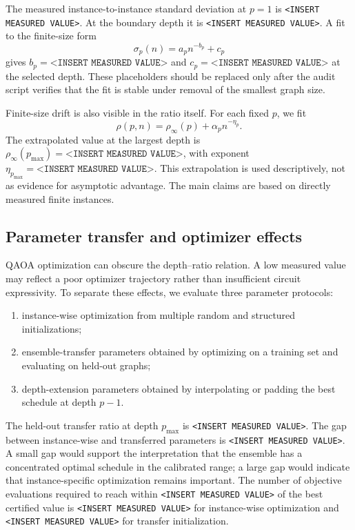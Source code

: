 \documentclass[reprint,aps,longbibliography]{revtex4-2}
\begin{document}
The measured instance-to-instance standard deviation at $p=1$ is \texttt{<INSERT MEASURED VALUE>}. At the boundary depth it is \texttt{<INSERT MEASURED VALUE>}. A fit to the finite-size form
\begin{equation}
  \sigma_p(n)=a_p n^{-b_p}+c_p
\end{equation}
gives $b_p=\texttt{<INSERT MEASURED VALUE>}$ and $c_p=\texttt{<INSERT MEASURED VALUE>}$ at the selected depth. These placeholders should be replaced only after the audit script verifies that the fit is stable under removal of the smallest graph size.

Finite-size drift is also visible in the ratio itself. For each fixed $p$, we fit
\begin{equation}
  \rho(p,n)=\rho_\infty(p)+\alpha_p n^{-\eta_p}.
\end{equation}
The extrapolated value at the largest depth is $\rho_\infty(p_{\max})=\texttt{<INSERT MEASURED VALUE>}$, with exponent $\eta_{p_{\max}}=\texttt{<INSERT MEASURED VALUE>}$. This extrapolation is used descriptively, not as evidence for asymptotic advantage. The main claims are based on directly measured finite instances.

\subsection{Parameter transfer and optimizer effects}
\label{subsec:optimizer_effects}

QAOA optimization can obscure the depth--ratio relation. A low measured value may reflect a poor optimizer trajectory rather than insufficient circuit expressivity. To separate these effects, we evaluate three parameter protocols:
\begin{enumerate}[label=(\roman*)]
\item instance-wise optimization from multiple random and structured initializations;
\item ensemble-transfer parameters obtained by optimizing on a training set and evaluating on held-out graphs;
\item depth-extension parameters obtained by interpolating or padding the best schedule at depth $p-1$.
\end{enumerate}

The held-out transfer ratio at depth $p_{\max}$ is \texttt{<INSERT MEASURED VALUE>}. The gap between instance-wise and transferred parameters is \texttt{<INSERT MEASURED VALUE>}. A small gap would support the interpretation that the ensemble has a concentrated optimal schedule in the calibrated range; a large gap would indicate that instance-specific optimization remains important. The number of objective evaluations required to reach within \texttt{<INSERT MEASURED VALUE>} of the best certified value is \texttt{<INSERT MEASURED VALUE>} for instance-wise optimization and \texttt{<INSERT MEASURED VALUE>} for transfer initialization.
\end{document}

